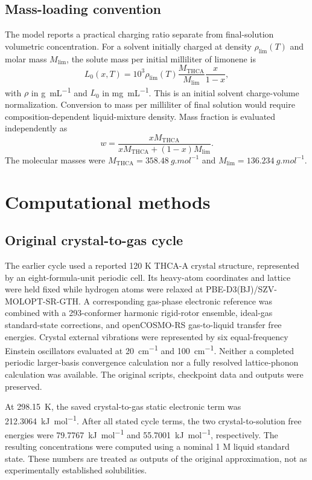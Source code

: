 \documentclass[10pt,a4paper,twocolumn]{article}
\begin{document}
\subsection{Mass-loading convention}
The model reports a practical charging ratio separate from final-solution volumetric concentration. For a solvent initially charged at density $\rho_{\mathrm{lim}}(T)$ and molar mass $M_{\mathrm{lim}}$, the solute mass per initial milliliter of limonene is
\begin{equation}
L_0(x,T)=10^{3}\rho_{\mathrm{lim}}(T)
\frac{M_{\mathrm{THCA}}}{M_{\mathrm{lim}}}
\frac{x}{1-x},
\label{eq:loading}
\end{equation}
with $\rho$ in \si{g.mL^{-1}} and $L_0$ in \si{mg.mL^{-1}}. This is an initial solvent charge-volume normalization. Conversion to mass per milliliter of final solution would require composition-dependent liquid-mixture density. Mass fraction is evaluated independently as
\begin{equation}
w=\frac{xM_{\mathrm{THCA}}}
{xM_{\mathrm{THCA}}+(1-x)M_{\mathrm{lim}}}.
\label{eq:massfrac}
\end{equation}
The molecular masses were $M_{\mathrm{THCA}}=\SI{358.48}{g.mol^{-1}}$ and $M_{\mathrm{lim}}=\SI{136.234}{g.mol^{-1}}$.

\section{Computational methods}\label{sec:methods}
\subsection{Original crystal-to-gas cycle}
The earlier cycle used a reported 120 K THCA-A crystal structure, represented by an eight-formula-unit periodic cell. Its heavy-atom coordinates and lattice were held fixed while hydrogen atoms were relaxed at PBE-D3(BJ)/SZV-MOLOPT-SR-GTH. A corresponding gas-phase electronic reference was combined with a 293-conformer harmonic rigid-rotor ensemble, ideal-gas standard-state corrections, and openCOSMO-RS gas-to-liquid transfer free energies. Crystal external vibrations were represented by six equal-frequency Einstein oscillators evaluated at \SI{20}{cm^{-1}} and \SI{100}{cm^{-1}}. Neither a completed periodic larger-basis convergence calculation nor a fully resolved lattice-phonon calculation was available. The original scripts, checkpoint data and outputs were preserved.

At \SI{298.15}{K}, the saved crystal-to-gas static electronic term was \SI{212.3064}{kJ.mol^{-1}}. After all stated cycle terms, the two crystal-to-solution free energies were \SI{79.7767}{kJ.mol^{-1}} and \SI{55.7001}{kJ.mol^{-1}}, respectively. The resulting concentrations were computed using a nominal 1 M liquid standard state. These numbers are treated as outputs of the original approximation, not as experimentally established solubilities.
\end{document}
